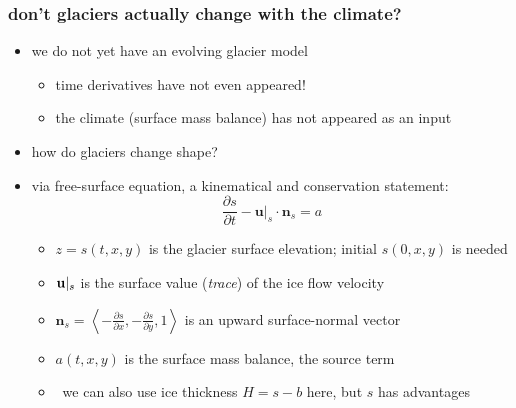 \documentclass[10pt,
               hyperref={colorlinks,citecolor=DeepPink4,linkcolor=black,urlcolor=blue},
               svgnames]{beamer}
\newcommand{\bn}{\mathbf{n}}
\newcommand{\bu}{\mathbf{u}}
\newcommand{\RR}{\mathbb{R}}
\newcommand{\detailgo}[1]{\smallskip \hspace{-4mm} \hyperlink{#1}{\beamergotobutton{details}} \,}
\begin{document}
\begin{frame}[label=skeintro]
\frametitle{don't glaciers actually change with the climate?}

\begin{itemize}
\item we do not \alert{yet} have an evolving glacier model
    \begin{itemize}
    \item[$\circ$] time derivatives have not even appeared!
    \item[$\circ$] the climate (surface mass balance) has not appeared as an input
    \end{itemize}

\medskip
\item<2>[Q.] how do glaciers change shape?

\item<2>[A.] via \alert{free-surface equation}, a kinematical and conservation statement:
\begin{equation}
\frac{\partial s}{\partial t} - \bu|_s \cdot \bn_s = a
\end{equation}

    \begin{itemize}
    \item[$\circ$] $z=s(t,x,y)$ is the glacier surface elevation; initial $s(0,x,y)$ is needed
\smallskip
    \item[$\circ$] $\bu|_s\strut$ is the surface value (\emph{trace}) of the ice flow velocity
    \item[$\circ$] $\bn_s=\left<-\frac{\partial s}{\partial x},-\frac{\partial s}{\partial y},1\right>$ is an upward surface-normal vector
\smallskip
    \item[$\circ$] $a(t,x,y)$ is the \alert{surface mass balance}, the source term
\smallskip
\smallskip
    \item[] \detailgo{svsH} we can also use ice thickness $H=s-b$ here, but $s$ has advantages
    \end{itemize}
\end{itemize}
\end{frame}
\end{document}
